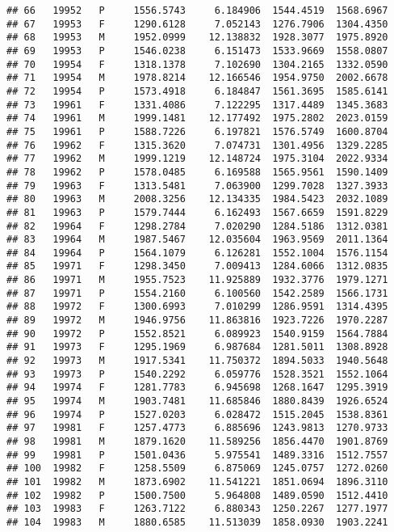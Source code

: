 \documentclass[]{article}
\begin{document}
\begin{verbatim}
## 66   19952   P     1556.5743     6.184906  1544.4519  1568.6967
## 67   19953   F     1290.6128     7.052143  1276.7906  1304.4350
## 68   19953   M     1952.0999    12.138832  1928.3077  1975.8920
## 69   19953   P     1546.0238     6.151473  1533.9669  1558.0807
## 70   19954   F     1318.1378     7.102690  1304.2165  1332.0590
## 71   19954   M     1978.8214    12.166546  1954.9750  2002.6678
## 72   19954   P     1573.4918     6.184847  1561.3695  1585.6141
## 73   19961   F     1331.4086     7.122295  1317.4489  1345.3683
## 74   19961   M     1999.1481    12.177492  1975.2802  2023.0159
## 75   19961   P     1588.7226     6.197821  1576.5749  1600.8704
## 76   19962   F     1315.3620     7.074731  1301.4956  1329.2285
## 77   19962   M     1999.1219    12.148724  1975.3104  2022.9334
## 78   19962   P     1578.0485     6.169588  1565.9561  1590.1409
## 79   19963   F     1313.5481     7.063900  1299.7028  1327.3933
## 80   19963   M     2008.3256    12.134335  1984.5423  2032.1089
## 81   19963   P     1579.7444     6.162493  1567.6659  1591.8229
## 82   19964   F     1298.2784     7.020290  1284.5186  1312.0381
## 83   19964   M     1987.5467    12.035604  1963.9569  2011.1364
## 84   19964   P     1564.1079     6.126281  1552.1004  1576.1154
## 85   19971   F     1298.3450     7.009413  1284.6066  1312.0835
## 86   19971   M     1955.7523    11.925889  1932.3776  1979.1271
## 87   19971   P     1554.2160     6.100560  1542.2589  1566.1731
## 88   19972   F     1300.6993     7.010299  1286.9591  1314.4395
## 89   19972   M     1946.9756    11.863816  1923.7226  1970.2287
## 90   19972   P     1552.8521     6.089923  1540.9159  1564.7884
## 91   19973   F     1295.1969     6.987684  1281.5011  1308.8928
## 92   19973   M     1917.5341    11.750372  1894.5033  1940.5648
## 93   19973   P     1540.2292     6.059776  1528.3521  1552.1064
## 94   19974   F     1281.7783     6.945698  1268.1647  1295.3919
## 95   19974   M     1903.7481    11.685846  1880.8439  1926.6524
## 96   19974   P     1527.0203     6.028472  1515.2045  1538.8361
## 97   19981   F     1257.4773     6.885696  1243.9813  1270.9733
## 98   19981   M     1879.1620    11.589256  1856.4470  1901.8769
## 99   19981   P     1501.0436     5.975541  1489.3316  1512.7557
## 100  19982   F     1258.5509     6.875069  1245.0757  1272.0260
## 101  19982   M     1873.6902    11.541221  1851.0694  1896.3110
## 102  19982   P     1500.7500     5.964808  1489.0590  1512.4410
## 103  19983   F     1263.7122     6.880343  1250.2267  1277.1977
## 104  19983   M     1880.6585    11.513039  1858.0930  1903.2241

\end{verbatim}
\end{document}
